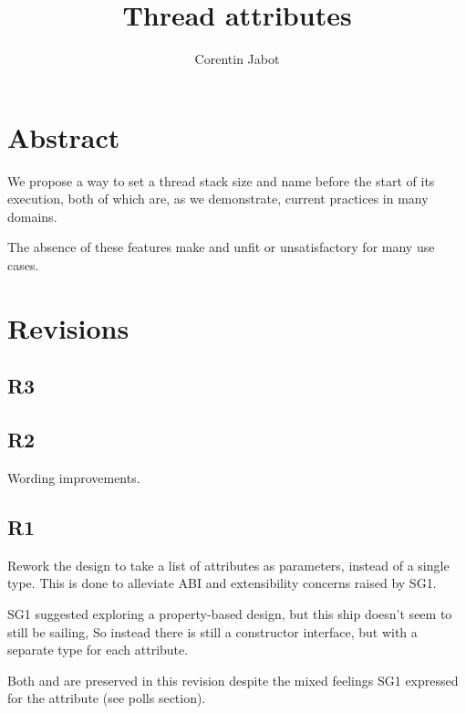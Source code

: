 \documentclass{wg21}
\title{Thread attributes}
\author{Corentin Jabot}{corentin.jabot@gmail.com}
\begin{document}
\maketitle

\setlength{\arrayrulewidth}{0.2mm}
\setlength{\tabcolsep}{8pt}
\renewcommand{\arraystretch}{1.}

\def\changemargin#1#2{\list{}{\rightmargin#2\leftmargin#1}\item[]}
\let\endchangemargin=\endlist
\setlength\extrarowheight{5pt}


\section{Abstract}

We propose a way to set a thread stack size and name before the start of its execution, both of which are,
as we demonstrate, current practices in many domains.

The absence of these features make  and  unfit or unsatisfactory for many use cases.

\section{Revisions}

\subsection{R3}

\subsection{R2}

Wording improvements.

\subsection{R1}

Rework the design to take a list of attributes as parameters, instead of a single type.
This is done to alleviate ABI and extensibility concerns raised by SG1.

SG1 suggested exploring a property-based design, but this ship doesn't seem to still be sailing,
So instead there is still a constructor interface, but with a separate type for each attribute.

Both  and  are preserved in this revision despite the
mixed feelings SG1 expressed for the  attribute (see polls section).
\end{document}
